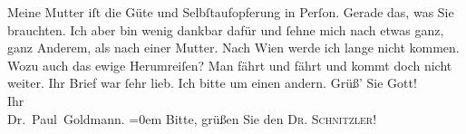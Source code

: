 \begin{ledgroupsized}[t]{13cm}
           \pstart
           Meine Mutter iſt die Güte
               und Selbſtaufopferung in Perſon. Gerade das, was Sie brauchten. Ich aber bin wenig
               dankbar dafür und ſehne mich nach etwas ganz, ganz Anderem, als nach einer
               Mutter.\pend
           \pstart
           Nach Wien werde ich lange nicht kommen. Wozu auch
               das ewige Herumreiſen? {\pb}Man fährt und fährt und
               kommt doch nicht weiter.\pend
           \pstart
           Ihr Brief war ſehr lieb. Ich bitte um einen andern.\pend
           \pstart
           Grüß’ Sie Gott! {\\[\baselineskip]}Ihr {\\[\baselineskip]}\spacefill\mbox{Dr. Paul Goldmann.}\pend
           \leftskip=0em{}\pstart
           \noindent{}Bitte, grüßen Sie den \textsc{Dr. Schnitzler}!\pend
           
         
         \endnumbering{}\end{ledgroupsized}  \newcommand{\dateiname}{L03538}\newcommand{\titel}{Paul Goldmann an Olga und Elisabeth Gussmann, 28. 12. [1900?]}\newcommand{\editorInnen}{Martin Anton Müller und Laura Untner}
      